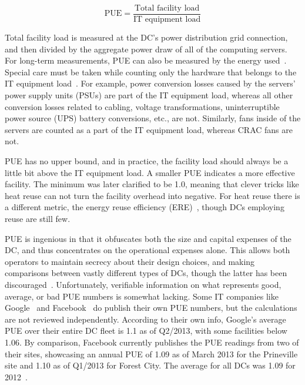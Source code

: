 \documentclass[officiallayout]{tktla}
\begin{document}
$$ \text{PUE} = \frac{\text{Total facility load}}{\text{IT equipment load}} $$

Total facility load is measured at the DC's power distribution grid
connection, and then divided by the aggregate power draw of all of the
computing servers. For long-term measurements, PUE can also be measured by the
energy used~\cite{Haas2009}. Special care must be taken while counting only
the hardware that belongs to the IT equipment load~\cite{Belady2008a}. For
example, power conversion losses caused by the servers' power supply units
(PSUs) are part of the IT equipment load, whereas all other conversion losses
related to cabling, voltage transformations, uninterruptible power source
(UPS) battery conversions, etc., are not. Similarly, fans inside of the
servers are counted as a part of the IT equipment load, whereas CRAC fans are
not.

PUE has no upper bound, and in practice, the facility load should always be a
little bit above the IT equipment load. A smaller PUE indicates a more
effective facility. The minimum was later clarified to be 1.0, meaning that
clever tricks like heat reuse can not turn the facility overhead into
negative. For heat reuse there is a different metric, the energy reuse
efficiency (ERE)~\cite{Azevedo2011,Patterson2010}, though DCs employing reuse
are still few.

PUE is ingenious in that it obfuscates both the size and capital expenses of
the DC, and thus concentrates on the operational expenses alone.  This allows
both operators to maintain secrecy about their design choices, and making
comparisons between vastly different types of DCs, though the latter has been
discouraged~\cite{Haas2009}. Unfortunately, verifiable information on what
represents good, average, or bad PUE numbers is somewhat lacking. Some IT
companies like Google~\cite{Google2013} and Facebook~\cite{McTiernan2013} do
publish their own PUE numbers, but the calculations are not reviewed
independently. According to their own info, Google's average PUE over their
entire DC fleet is 1.1 as of Q2/2013, with some facilities below 1.06. By
comparison, Facebook currently publishes the PUE readings from two of their
sites, showcasing an annual PUE of 1.09 as of March 2013 for the Prineville
site and 1.10 as of Q1/2013 for Forest City. The average for all DCs was 1.09
for 2012~\cite{Facebook2013}.
\end{document}
